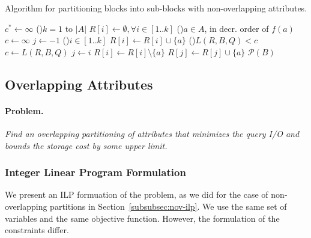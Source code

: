 \begin{algorithm}[ht]
\scriptsize
\caption{Algorithm for partitioning blocks into sub-blocks with non-overlapping attributes.}
\label{alg:overlappingP}
$c^*\leftarrow \infty$ 
\For(){$k=1$ to $|A|$}{
   $R[i]\leftarrow \emptyset, \forall i\in [1..k]$ 
   \For(){$a \in A$\textnormal{, in decr.\/ order of }$f(a)$}{
      $c\leftarrow \infty$   
      $j\leftarrow -1$ 
      \For(){$i\in [1..k]$} {
         $R[i]\leftarrow R[i] \cup \{a\}$
         \If(){$L(R, B, Q)<c$}{
            $c\leftarrow L(R, B, Q)$
            $j\leftarrow i$
         }
         $R[i]\leftarrow R[i] \setminus \{a\}$
      }
      $R[j]\leftarrow R[j] \cup \{a\}$
   }
}
\Return $\mathcal{P}(B)$ 
\end{algorithm} 

\clearpage
\newpage
\subsection{Overlapping Attributes}

\paragraph*{Problem.$\,$} \emph{Find an overlapping partitioning of attributes
that minimizes the query I/O and bounds the storage cost by some upper
limit.}

\subsubsection{Integer Linear Program Formulation}
We present an ILP formuation of the problem, as we did for the case of
non-overlapping partitions in Section~\ref{subsubsec:nov-ilp}. We use the same
set of variables and the same objective function. However, the formulation of
the constraints differ. 

